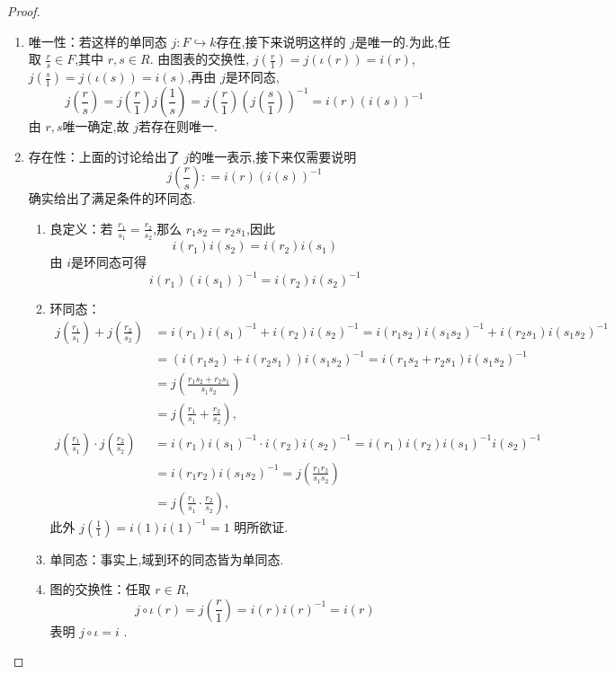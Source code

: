 \documentclass[lang=cn,12pt,color=green,fontset=none,pad]{elegantbook}
\begin{document}
\begin{proof}
    \begin{enumerate}
        \item 唯一性：若这样的单同态 $ j:F \hookrightarrow  k $存在,接下来说明这样的 $ j $是唯一的.为此,任取 $ \frac{r}{s} \in  F $,其中 $ r,s \in  R $.
        由图表的交换性, $j\left( \frac{r}{1} \right)=   j\left( \iota\left( r \right)  \right)= i\left( r \right)   $,$ j\left( \frac{s}{1} \right)  =j\left( \iota\left( s \right)  \right)= i\left( s \right)   $,再由 $ j $是环同态,  $$
        j\left( \frac{r}{s} \right)=  j\left( \frac{r}{1} \right) j\left(  \frac{1}{s} \right) = j\left( \frac{r}{1}  \right) \left( j\left( \frac{s}{1} \right)   \right)^{-1}     = i\left( r \right)\left( i\left( s \right)  \right)^{-1}   
        $$由 $ r,s $唯一确定,故 $ j $若存在则唯一.
        \item 存在性：上面的讨论给出了 $ j $的唯一表示,接下来仅需要说明 $$
        j\left( \frac{r}{s} \right): = i\left( r \right)\left( i\left( s \right)  \right)^{-1}    
        $$确实给出了满足条件的环同态.\begin{enumerate}
            \item 良定义：若 $ \frac{r_1}{s_1 }= \frac{r_2}{s_2} $,那么 $ r_1s_2=r_2s_1 $,因此 $$
            i\left( r_1 \right)i\left( s_2 \right)= i\left( r_2 \right) i\left( s_{1} \right)    
            $$ 由 $ i $是环同态可得 $$
            i\left( r_1 \right) \left( i\left( s_1 \right)  \right)^{-1} = i\left( r_2 \right) i\left( s_2 \right)^{-1}     
            $$ 
            \item 环同态：$$\begin{aligned}
                  j\left(\frac{r_1}{s_1}\right)+j\left(\frac{r_2}{s_2}\right) & =i(r_1)i(s_1)^{-1}+i(r_2)i(s_2)^{-1}=i(r_1s_2)i(s_1s_2)^{-1}+i(r_2s_1)i(s_1s_2)^{-1} \\
                 & =(i(r_1s_2)+i(r_2s_1))i(s_1s_2)^{-1}=i(r_1s_2+r_2s_1)i(s_1s_2)^{-1} \\
                 & =j\left(\frac{r_1s_2+r_2s_1}{s_1s_2}\right) \\
                 & =j\left(\frac{r_1}{s_1}+\frac{r_2}{s_2}\right), \\
                  j\left(\frac{r_1}{s_1}\right)\cdot j\left(\frac{r_2}{s_2}\right) & =i(r_1)i(s_1)^{-1}\cdot i(r_2)i(s_2)^{-1}=i(r_1)i(r_2)i(s_1)^{-1}i(s_2)^{-1} \\
                 & =i(r_1r_2)i(s_1s_2)^{-1}=j\left(\frac{r_1r_2}{s_1s_2}\right) \\
                   & =j\left(\frac{r_1}{s_1}\cdot\frac{r_2}{s_2}\right),
\end{aligned}$$此外 $ j\left( \frac{1}{1} \right)= i\left( 1 \right)i\left( 1 \right)^{-1} =1    $ 明所欲证.
            \item 单同态：事实上,域到环的同态皆为单同态.
            \item 图的交换性：任取 $ r \in R $, $$
            j\circ \iota\left( r \right) = j\left(  \frac{r}{1} \right) = i\left( r \right) i\left( r \right)^{-1} = i \left( r \right)    
            $$表明 $  j\circ \iota=i $  .
        \end{enumerate}
                  

\end{enumerate}
\end{proof}
\end{document}
